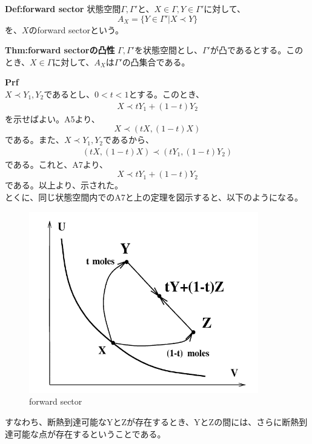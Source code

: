 \documentclass[a4paper,11pt]{jsarticle}
\numberwithin{equation}{section}
\begin{document}
\begin{itembox}[l]{\textbf{Def:forward sector}}
    状態空間$\Gamma,\Gamma'$と、$X \in \Gamma,Y \in \Gamma'$に対して、
    \begin{equation}
        A_X = \{Y \in \Gamma'|X \prec Y\}
    \end{equation}
    を、$X$のforward sectorという。
\end{itembox}
\begin{itembox}[l]{\textbf{Thm:forward sectorの凸性}}
    $\Gamma,\Gamma'$を状態空間とし、$\Gamma '$が凸であるとする。このとき、$X \in \Gamma$に対して、$A_X$は$\Gamma'$の凸集合である。
\end{itembox}
\textbf{Prf}\\
$X \prec Y_1,Y_2$であるとし、$0 < t < 1$とする。このとき、
\begin{align}
    X \prec tY_1+(1-t)Y_2
\end{align}
を示せばよい。A5より、
\begin{equation}
    X \prec (tX,(1-t)X)
\end{equation}
である。また、$X \prec Y_1,Y_2$であるから、
\begin{align}
    (tX,(1-t)X) \prec (tY_1,(1-t)Y_2)
\end{align}
である。これと、A7より、
\begin{equation}
    X \prec tY_1+(1-t)Y_2
\end{equation}
である。以上より、示された。\hfill\qedsymbol\\
とくに、同じ状態空間内でのA7と上の定理を図示すると、以下のようになる。\\
\begin{figure}[H]
    \begin{center}
    \includegraphics[width=100mm]{fig3.png}
    \end{center}
    \caption{forward sector}
    \label{fig:two}
\end{figure}
すなわち、断熱到達可能なYとZが存在するとき、YとZの間には、さらに断熱到達可能な点が存在するということである。\\
\end{document}
